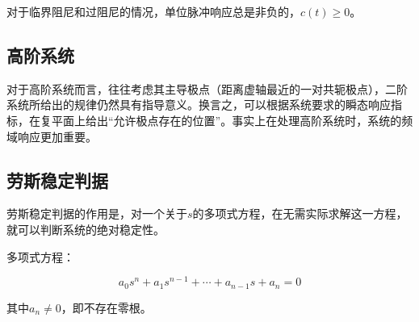 对于临界阻尼和过阻尼的情况，单位脉冲响应总是非负的，$c(t)\ge0$。



\subsection{高阶系统}

对于高阶系统而言，往往考虑其主导极点（距离虚轴最近的一对共轭极点），二阶系统所给出的规律仍然具有指导意义。换言之，可以根据系统要求的瞬态响应指标，在复平面上给出``允许极点存在的位置''。事实上在处理高阶系统时，系统的频域响应更加重要。

\subsection{劳斯稳定判据}

劳斯稳定判据的作用是，对一个关于$s$的多项式方程，在无需实际求解这一方程，就可以判断系统的绝对稳定性。

多项式方程：

\begin{equation*}
a_0s^n+a_1s^{n-1}+\cdots+a_{n-1}s+a_n=0
\end{equation*}

其中$a_n\neq0$，即不存在零根。

